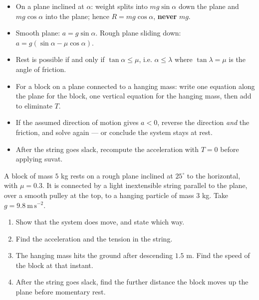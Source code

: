 \documentclass[11pt]{article}
\begin{document}
\begin{aretenir}
\begin{itemize}
\item On a plane inclined at $\alpha$: weight splits into $mg\sin\alpha$ down the plane and $mg\cos\alpha$ into the plane; hence $R = mg\cos\alpha$, \textbf{never} $mg$.
\item Smooth plane: $a = g\sin\alpha$. Rough plane sliding down: $a = g(\sin\alpha - \mu\cos\alpha)$.
\item Rest is possible if and only if $\tan\alpha \le \mu$, i.e. $\alpha \le \lambda$ where $\tan\lambda = \mu$ is the angle of friction.
\item For a block on a plane connected to a hanging mass: write one equation along the plane for the block, one vertical equation for the hanging mass, then add to eliminate $T$.
\item If the assumed direction of motion gives $a < 0$, reverse the direction \emph{and} the friction, and solve again — or conclude the system stays at rest.
\item After the string goes slack, recompute the acceleration with $T = 0$ before applying suvat.
\end{itemize}
\end{aretenir}

\begin{exercice}[Practice]
A block of mass $5$ kg rests on a rough plane inclined at $25^{\circ}$ to the horizontal, with $\mu = 0.3$. It is connected by a light inextensible string parallel to the plane, over a smooth pulley at the top, to a hanging particle of mass $3$ kg. Take $g = 9.8\ \mathrm{m\,s^{-2}}$.
\begin{enumerate}
\item Show that the system does move, and state which way.
\item Find the acceleration and the tension in the string.
\item The hanging mass hits the ground after descending $1.5$ m. Find the speed of the block at that instant.
\item After the string goes slack, find the further distance the block moves up the plane before momentary rest.
\end{enumerate}
\end{exercice}
\end{document}
